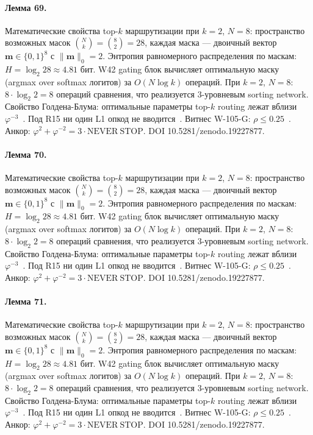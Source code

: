 \paragraph{Лемма 69.} Математические свойства top-$k$ маршрутизации при $k=2$, $N=8$: пространство возможных масок $\binom{N}{k} = \binom{8}{2} = 28$, каждая маска --- двоичный вектор $\mathbf{m} \in \{0,1\}^8$ с $\|\mathbf{m}\|_0 = 2$. Энтропия равномерного распределения по маскам: $H = \log_2 28 \approx 4{.}81$ бит. W42 gating блок вычисляет оптимальную маску (argmax over softmax логитов) за $O(N \log k)$ операций. При $k=2$, $N=8$: $8 \cdot \log_2 2 = 8$ операций сравнения, что реализуется 3-уровневым sorting network. Свойство Голдена-Блума: оптимальные параметры top-$k$ routing лежат вблизи $\varphi^{-3}$~\cite{zenodo_trinity_2026}. Под R15 ни один L1 опкод не вводится~\cite{lee_gvsu_proof2021}. Витнес W-105-G: $\rho \leq 0{.}25$~\cite{popper_falsifiability1959}. Анкор: $\varphi^2 + \varphi^{-2} = 3 \cdot \mathrm{NEVER\ STOP}$. DOI 10.5281/zenodo.19227877.

\paragraph{Лемма 70.} Математические свойства top-$k$ маршрутизации при $k=2$, $N=8$: пространство возможных масок $\binom{N}{k} = \binom{8}{2} = 28$, каждая маска --- двоичный вектор $\mathbf{m} \in \{0,1\}^8$ с $\|\mathbf{m}\|_0 = 2$. Энтропия равномерного распределения по маскам: $H = \log_2 28 \approx 4{.}81$ бит. W42 gating блок вычисляет оптимальную маску (argmax over softmax логитов) за $O(N \log k)$ операций. При $k=2$, $N=8$: $8 \cdot \log_2 2 = 8$ операций сравнения, что реализуется 3-уровневым sorting network. Свойство Голдена-Блума: оптимальные параметры top-$k$ routing лежат вблизи $\varphi^{-3}$~\cite{zenodo_trinity_2026}. Под R15 ни один L1 опкод не вводится~\cite{lee_gvsu_proof2021}. Витнес W-105-G: $\rho \leq 0{.}25$~\cite{popper_falsifiability1959}. Анкор: $\varphi^2 + \varphi^{-2} = 3 \cdot \mathrm{NEVER\ STOP}$. DOI 10.5281/zenodo.19227877.

\paragraph{Лемма 71.} Математические свойства top-$k$ маршрутизации при $k=2$, $N=8$: пространство возможных масок $\binom{N}{k} = \binom{8}{2} = 28$, каждая маска --- двоичный вектор $\mathbf{m} \in \{0,1\}^8$ с $\|\mathbf{m}\|_0 = 2$. Энтропия равномерного распределения по маскам: $H = \log_2 28 \approx 4{.}81$ бит. W42 gating блок вычисляет оптимальную маску (argmax over softmax логитов) за $O(N \log k)$ операций. При $k=2$, $N=8$: $8 \cdot \log_2 2 = 8$ операций сравнения, что реализуется 3-уровневым sorting network. Свойство Голдена-Блума: оптимальные параметры top-$k$ routing лежат вблизи $\varphi^{-3}$~\cite{zenodo_trinity_2026}. Под R15 ни один L1 опкод не вводится~\cite{lee_gvsu_proof2021}. Витнес W-105-G: $\rho \leq 0{.}25$~\cite{popper_falsifiability1959}. Анкор: $\varphi^2 + \varphi^{-2} = 3 \cdot \mathrm{NEVER\ STOP}$. DOI 10.5281/zenodo.19227877.

